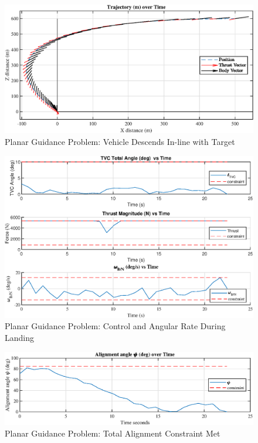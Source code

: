 \begin{figure}[!htbp] 
  \centering
  \includegraphics[width=\textwidth]{figs/planar_traj.eps}
  \caption{Planar Guidance Problem: Vehicle Descends In-line with Target}
  \label{fig:planar}
 \end{figure}
\begin{figure}[!htbp] 
\label{planar_controls}
  \centering
  \includegraphics[width=\textwidth]{figs/planar_controls.eps}
  \caption{Planar Guidance Problem: Control and Angular Rate During Landing}
  \label{fig:planarcontrols}
 \end{figure}

\begin{figure}[!htbp] 
  \centering
  \includegraphics[width=\textwidth]{figs/planar_alignment.eps}
  \caption{Planar Guidance Problem: Total Alignment Constraint Met}
  \label{fig:nplanar_align}
 \end{figure}


